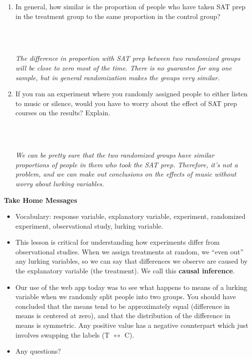 \begin{enumerate}
\item In general, how similar is the proportion of people who have
  taken SAT prep in the treatment group to the same proportion in the
  control group? 
\begin{students}
        \vspace{3cm}\\
\end{students}
\begin{key}
  \\ {\it  The difference in proportion with SAT prep between two
    randomized groups will be close to zero most of the time.  There
    is no guarantee for any one sample, but in general randomization
    makes the groups very similar.} 
\end{key}
\item If you ran an experiment where you randomly assigned people to
  either listen to music or silence, would you have to worry about the effect
  of SAT prep courses on the results?  Explain. 
\begin{students}
        \vspace{\fill}\\
\end{students}
\begin{key}
  \\ {\it We can be pretty sure that the two randomized groups have
    similar proportions of people in them who took the SAT prep.
    Therefore, it's not a problem, and we can make out conclusions on
    the effects of music without worry about lurking variables.}
\end{key} 
\end{enumerate}


\begin{center}
  {\bf Take Home Messages}
\end{center}
  \begin{itemize}
  \item Vocabulary:  response variable, explanatory variable,
    experiment, randomized experiment, observational study, lurking
    variable.
  \item This lesson is critical for understanding how experiments
    differ from observational studies.  When we assign treatments at
    random, we ``even out'' any lurking variables, so we can say that
    differences we observe are caused by the explanatory variable (the
    treatment). We call this {\bf causal inference}.
  \item  Our use of the web app today was to see what happens to means
    of a lurking variable when we randomly split people into two
    groups. You should have concluded that the means tend to be
    approximately equal (difference in means is centered at zero), and
    that the distribution of the difference in means is symmetric. Any
    positive value has a negative counterpart which just involves
    swapping the labels (T $\longleftrightarrow$ C).

 \item 
  Any questions? 
  \end{itemize}


